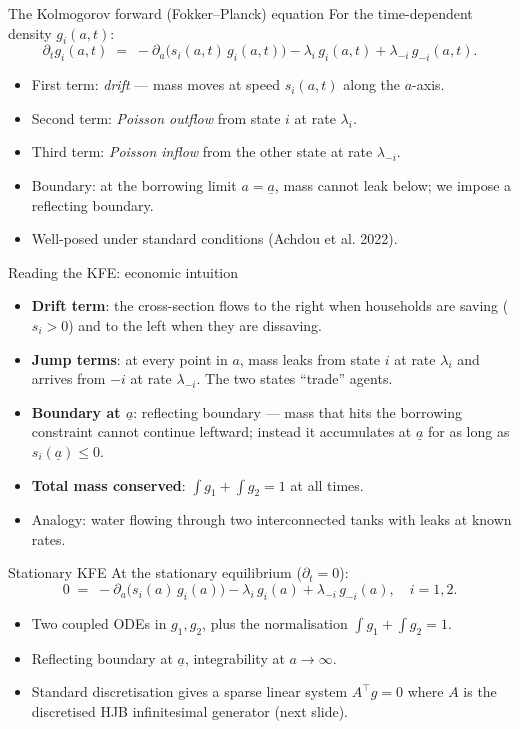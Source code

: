 \documentclass[10pt,english,aspectratio=169]{beamer}
\begin{document}
\begin{frame}{The Kolmogorov forward (Fokker--Planck) equation}
For the time-dependent density $g_i(a,t)$:
\[
\partial_t g_i(a,t) \;=\; -\partial_a\!\big(s_i(a,t)\, g_i(a,t)\big)
- \lambda_i\, g_i(a,t) + \lambda_{-i}\, g_{-i}(a,t).
\]
\medskip

\begin{itemize}
\item First term: \emph{drift} --- mass moves at speed $s_i(a,t)$ along the $a$-axis.
\item Second term: \emph{Poisson outflow} from state $i$ at rate $\lambda_i$.
\item Third term: \emph{Poisson inflow} from the other state at rate $\lambda_{-i}$.
\medskip
\item Boundary: at the borrowing limit $a = \underline a$, mass cannot leak below; we impose a reflecting boundary.
\medskip
\item Well-posed under standard conditions (Achdou et al. 2022).
\end{itemize}
\end{frame}

\begin{frame}{Reading the KFE: economic intuition}
\begin{itemize}
\item \textbf{Drift term}: the cross-section flows to the right when households are saving ($s_i > 0$) and to the left when they are dissaving.
\medskip
\item \textbf{Jump terms}: at every point in $a$, mass leaks from state $i$ at rate $\lambda_i$ and arrives from $-i$ at rate $\lambda_{-i}$. The two states ``trade'' agents.
\medskip
\item \textbf{Boundary at $\underline a$}: reflecting boundary --- mass that hits the borrowing constraint cannot continue leftward; instead it accumulates at $\underline a$ for as long as $s_i(\underline a) \leq 0$.
\medskip
\item \textbf{Total mass conserved}: $\int g_1 + \int g_2 = 1$ at all times.
\medskip
\item Analogy: water flowing through two interconnected tanks with leaks at known rates.
\end{itemize}
\end{frame}

\begin{frame}{Stationary KFE}
At the stationary equilibrium ($\partial_t = 0$):
\[
0 \;=\; -\partial_a\!\big(s_i(a)\, g_i(a)\big) - \lambda_i\, g_i(a) + \lambda_{-i}\, g_{-i}(a),
\quad i = 1, 2.
\]
\medskip

\begin{itemize}
\item Two coupled ODEs in $g_1, g_2$, plus the normalisation $\int g_1 + \int g_2 = 1$.
\medskip
\item Reflecting boundary at $\underline a$, integrability at $a \to \infty$.
\medskip
\item Standard discretisation gives a sparse linear system $A^\top g = 0$ where $A$ is the discretised HJB infinitesimal generator (next slide).
\end{itemize}
\end{frame}
\end{document}
